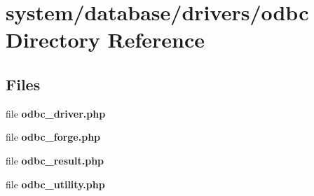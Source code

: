 \section{system/database/drivers/odbc Directory Reference}
\label{dir_5edab66afb78c79f394b1d2225c16407}
\subsection*{Files}
\begin{DoxyCompactItemize}
\item 
file {\bf odbc\-\_\-driver.\-php}
\item 
file {\bf odbc\-\_\-forge.\-php}
\item 
file {\bf odbc\-\_\-result.\-php}
\item 
file {\bf odbc\-\_\-utility.\-php}
\end{DoxyCompactItemize}
